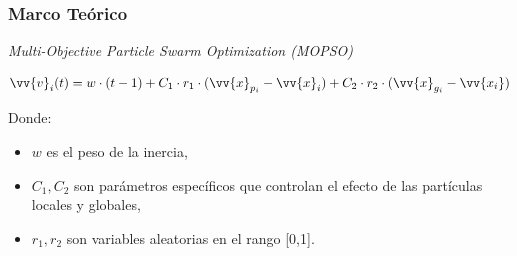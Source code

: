 \documentclass[usenames,dvipsnames]{beamer}
\begin{document}
\begin{frame}
\frametitle{Marco Teórico} 
\begin{exampleblock}{\textit{Multi-Objective Particle Swarm Optimization (MOPSO)}}

\begin{equation}\label{eq:velocidad1}
\vv{v}_i(t) = w \cdot (t-1) + C_1 \cdot r_1 \cdot (\vv{x}_{p_i} - \vv{x}_i) + C_2 \cdot r_2 \cdot (\vv{x}_{g_i} - \vv{x_i})
\end{equation}


Donde:

\begin{itemize}
\item $w$ es el peso de la inercia,
\item $C_1,C_2$ son parámetros específicos que controlan el efecto de las partículas locales y globales,
\item $r_1,r_2$ son variables aleatorias en el rango [0,1].
\end{itemize}


\end{exampleblock}


\end{frame}
\end{document}
